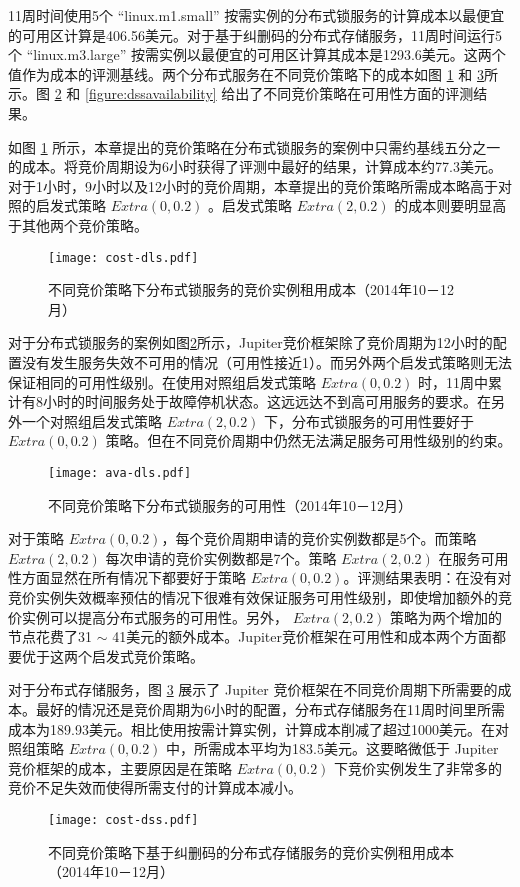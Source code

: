11周时间使用5个 ``linux.m1.small'' 按需实例的分布式锁服务的计算成本以最便宜的可用区计算是406.56美元。对于基于纠删码的分布式存储服务，11周时间运行5个 ``linux.m3.large'' 按需实例以最便宜的可用区计算其成本是1293.6美元。这两个值作为成本的评测基线。两个分布式服务在不同竞价策略下的成本如图 \ref{figure:dlscost} 和 \ref{figure:dsscost}所示。图 \ref{figure:dlsavailability} 和 \ref{figure:dssavailability} 给出了不同竞价策略在可用性方面的评测结果。

如图 \ref{figure:dlscost} 所示，本章提出的竞价策略在分布式锁服务的案例中只需约基线五分之一的成本。将竞价周期设为6小时获得了评测中最好的结果，计算成本约77.3美元。对于1小时，9小时以及12小时的竞价周期，本章提出的竞价策略所需成本略高于对照的启发式策略 $Extra(0, 0.2)$ 。启发式策略 $Extra(2, 0.2)$ 的成本则要明显高于其他两个竞价策略。
\begin{figure}
  \centering
  \texttt{[image: cost-dls.pdf]}
  \caption{不同竞价策略下分布式锁服务的竞价实例租用成本（2014年10－12月）}
  \label{figure:dlscost}
\end{figure}

对于分布式锁服务的案例如图\ref{figure:dlsavailability}所示，Jupiter竞价框架除了竞价周期为12小时的配置没有发生服务失效不可用的情况（可用性接近1）。而另外两个启发式策略则无法保证相同的可用性级别。在使用对照组启发式策略 $Extra(0, 0.2)$ 时，11周中累计有8小时的时间服务处于故障停机状态。这远远达不到高可用服务的要求。在另外一个对照组启发式策略 $Extra(2, 0.2)$ 下，分布式锁服务的可用性要好于 $Extra(0, 0.2)$ 策略。但在不同竞价周期中仍然无法满足服务可用性级别的约束。
\begin{figure}
  \centering
  \texttt{[image: ava-dls.pdf]}
  \caption{不同竞价策略下分布式锁服务的可用性（2014年10－12月）}
  \label{figure:dlsavailability}
\end{figure}

对于策略 $Extra(0, 0.2)$，每个竞价周期申请的竞价实例数都是5个。而策略 $Extra(2, 0.2)$ 每次申请的竞价实例数都是7个。策略 $Extra(2, 0.2)$ 在服务可用性方面显然在所有情况下都要好于策略 $Extra(0, 0.2)$。评测结果表明：在没有对竞价实例失效概率预估的情况下很难有效保证服务可用性级别，即使增加额外的竞价实例可以提高分布式服务的可用性。另外， $Extra(2, 0.2)$ 策略为两个增加的节点花费了31 $\sim$ 41美元的额外成本。Jupiter竞价框架在可用性和成本两个方面都要优于这两个启发式竞价策略。

对于分布式存储服务，图 \ref{figure:dsscost} 展示了 Jupiter 竞价框架在不同竞价周期下所需要的成本。最好的情况还是竞价周期为6小时的配置，分布式存储服务在11周时间里所需成本为189.93美元。相比使用按需计算实例，计算成本削减了超过1000美元。在对照组策略 $Extra(0, 0.2)$ 中，所需成本平均为183.5美元。这要略微低于 Jupiter 竞价框架的成本，主要原因是在策略 $Extra(0, 0.2)$ 下竞价实例发生了非常多的竞价不足失效而使得所需支付的计算成本减小。
\begin{figure}
  \centering
  \texttt{[image: cost-dss.pdf]}
  \caption{不同竞价策略下基于纠删码的分布式存储服务的竞价实例租用成本（2014年10－12月）}
  \label{figure:dsscost}
\end{figure}

